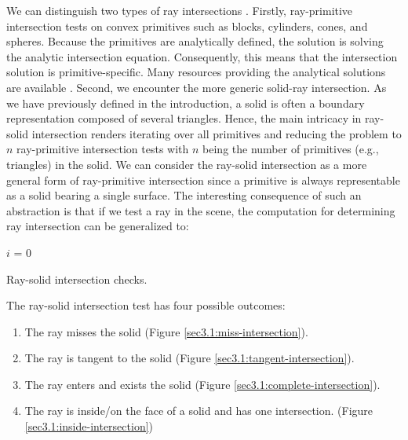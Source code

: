 \documentclass[a4paper,11pt,oneside]{article}
\begin{document}
We can distinguish two types of ray intersections \cite{rasterization_scratch_pixel}. Firstly, ray-primitive intersection tests on convex primitives such as blocks, cylinders, cones, and spheres. Because the primitives are analytically defined, the solution is solving the analytic intersection equation. Consequently, this means that the intersection solution is primitive-specific. Many resources providing the analytical solutions are available \cite{ray_primitive_intersections}.
Second, we encounter the more generic solid-ray intersection. As we have previously defined in the introduction, a solid is often a boundary representation composed of several triangles. Hence, the main intricacy in ray-solid intersection renders iterating over all primitives and reducing the problem to $n$ ray-primitive intersection tests with $n$ being the number of primitives (e.g., triangles) in the solid.
We can consider the ray-solid intersection as a more general form of ray-primitive intersection since a primitive is always representable as a solid bearing a single surface. The interesting consequence of such an abstraction is that if we test a ray in the scene, the computation for determining ray intersection can be generalized to:

\begin{algorithm}[H]
	\SetAlgoLined
	$i$ = 0\;
	\caption{Ray-solid intersection checks.}
\end{algorithm}

The ray-solid intersection test has four possible outcomes:
\begin{enumerate}
	\item The ray misses the solid (Figure \ref{sec3.1:miss-intersection}).
	\item The ray is tangent to the solid (Figure \ref{sec3.1:tangent-intersection}).
	\item The ray enters and exists the solid (Figure \ref{sec3.1:complete-intersection}).
	\item The ray is inside/on the face of a solid and has one intersection. (Figure \ref{sec3.1:inside-intersection})
\end{enumerate}
\end{document}
